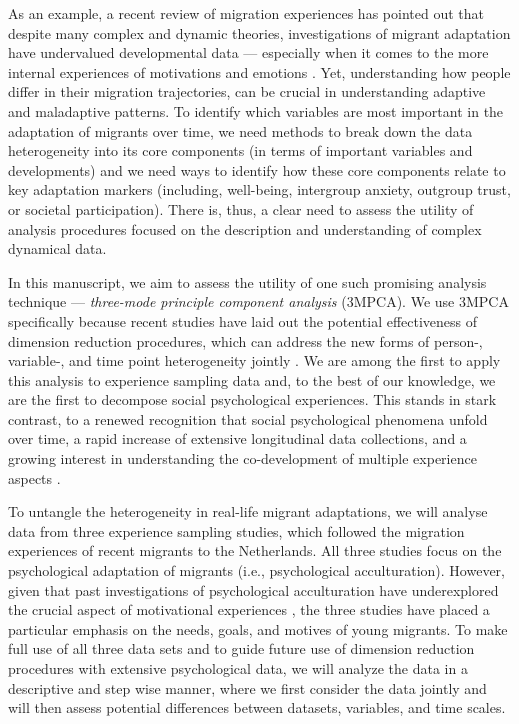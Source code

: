 \documentclass[]{article}
\begin{document}
As an example, a recent review of migration experiences has pointed out
that despite many complex and dynamic theories, investigations of
migrant adaptation have undervalued developmental data --- especially
when it comes to the more internal experiences of motivations and
emotions \citep{Kreienkamp2022d}. Yet, understanding how people differ
in their migration trajectories, can be crucial in understanding
adaptive and maladaptive patterns. To identify which variables are most
important in the adaptation of migrants over time, we need methods to
break down the data heterogeneity into its core components (in terms of
important variables and developments) and we need ways to identify how
these core components relate to key adaptation markers (including,
well-being, intergroup anxiety, outgroup trust, or societal
participation). There is, thus, a clear need to assess the utility of
analysis procedures focused on the description and understanding of
complex dynamical data.

In this manuscript, we aim to assess the utility of one such promising
analysis technique --- \textit{three-mode principle component analysis}
(3MPCA). We use 3MPCA specifically because recent studies have laid out
the potential effectiveness of dimension reduction procedures, which can
address the new forms of person-, variable-, and time point
heterogeneity jointly \citep[e.g.,][]{Monden2015}. We are among the
first to apply this analysis to experience sampling data and, to the
best of our knowledge, we are the first to decompose social
psychological experiences. This stands in stark contrast, to a renewed
recognition that social psychological phenomena unfold over time, a
rapid increase of extensive longitudinal data collections, and a growing
interest in understanding the co-development of multiple experience
aspects
\citep[e.g.,][]{Kreienkamp2022d, MacInnis2015, McKeown2017, Pettigrew2011, Ward2019}.

To untangle the heterogeneity in real-life migrant adaptations, we will
analyse data from three experience sampling studies, which followed the
migration experiences of recent migrants to the Netherlands. All three
studies focus on the psychological adaptation of migrants (i.e.,
psychological acculturation). However, given that past investigations of
psychological acculturation have underexplored the crucial aspect of
motivational experiences \citep{Kreienkamp2022d}, the three studies have
placed a particular emphasis on the needs, goals, and motives of young
migrants. To make full use of all three data sets and to guide future
use of dimension reduction procedures with extensive psychological data,
we will analyze the data in a descriptive and step wise manner, where we
first consider the data jointly and will then assess potential
differences between datasets, variables, and time scales.
\end{document}
